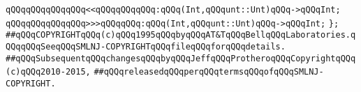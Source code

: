 \verb|qQQqqQQqqQQqqQQq<<qQQqqQQqqQQq:qQQq(Int,qQQqunt::Unt)qQQq->qQQqInt;|\newline
\verb|qQQqqQQqqQQqqQQq>>>qQQqqQQq:qQQq(Int,qQQqunt::Unt)qQQq->qQQqInt;|\newline
\verb|};|\newline
\newline
\newline
\verb|##qQQqCOPYRIGHTqQQq(c)qQQq1995qQQqbyqQQqAT&TqQQqBellqQQqLaboratories.qQQqqQQqSeeqQQqSMLNJ-COPYRIGHTqQQqfileqQQqforqQQqdetails.|\newline
\verb|##qQQqSubsequentqQQqchangesqQQqbyqQQqJeffqQQqProtheroqQQqCopyrightqQQq(c)qQQq2010-2015,|\newline
\verb|##qQQqreleasedqQQqperqQQqtermsqQQqofqQQqSMLNJ-COPYRIGHT.|\newline

